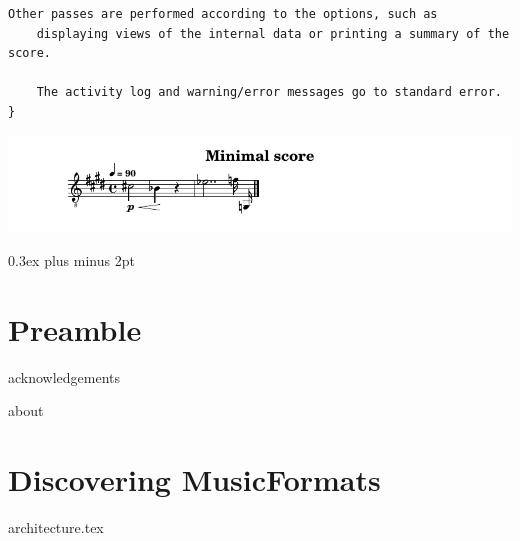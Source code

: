 \documentclass[11pt,a4paper]{report}
\begin{document}
\begin{titlepage}
\begin{center}
\begin{turn}{1}
{\begin{minipage}{\linewidth}
\begin{lstlisting}[language=Terminal]
    Other passes are performed according to the options, such as
    displaying views of the internal data or printing a summary of the score.

    The activity log and warning/error messages go to standard error.
}\end{lstlisting} %
\end{minipage}
}
\end{turn}

    \vspace{.5cm}

\includegraphics[scale=1.0]{../graphics/MinimalScore.png}

  \vfill

  \end{center}
\end{titlepage}

{ %
  \setlength {\parskip} {0.3ex plus \baselineskip minus 2pt}

  \tableofcontents

  \listoffigures
}


\part{Preamble}


\useRegularPagesHeadersAndFooters


{acknowledgements}

{about}


\part{Discovering MusicFormats}

{architecture.tex}
\end{document}
